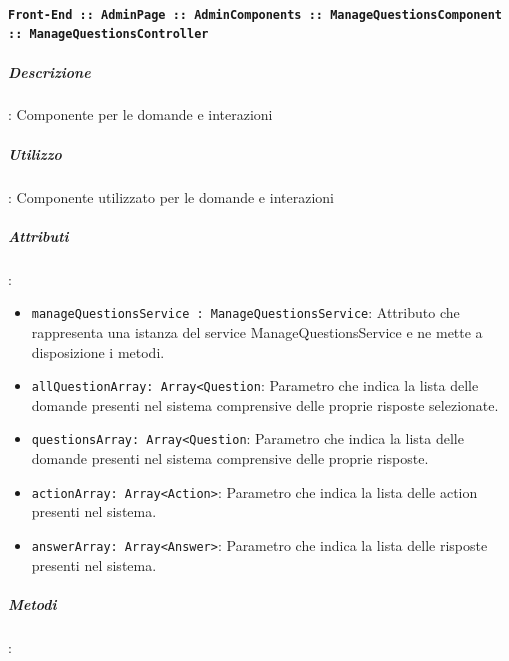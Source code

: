 \documentclass[../DefinizioneDiProdotto_v3.0.0.tex]{subfiles}
\begin{document}
			      \paragraph{\texttt{Front-End :: AdminPage :: AdminComponents :: ManageQuestionsComponent :: ManageQuestionsController}}
			      	\subparagraph{Descrizione}: Componente per le domande e interazioni
			      	\subparagraph{Utilizzo}: Componente utilizzato per le domande e interazioni
			      	\subparagraph{Attributi}:
      	      			\begin{itemize}
							\item \texttt{manageQuestionsService : ManageQuestionsService}: Attributo che rappresenta una istanza del service ManageQuestionsService e ne mette a disposizione i metodi.
							\item \texttt{allQuestionArray: Array<Question}: Parametro che indica la lista delle domande presenti nel sistema comprensive delle proprie risposte selezionate.
							\item \texttt{questionsArray: Array<Question}: Parametro che indica la lista delle domande presenti nel sistema comprensive delle proprie risposte.
							\item \texttt{actionArray: Array<Action>}: Parametro che indica la lista delle action presenti nel sistema.
							\item \texttt{answerArray: Array<Answer>}: Parametro che indica la lista delle risposte presenti nel sistema.

						\end{itemize}
						\subparagraph{Metodi}:
\end{document}
